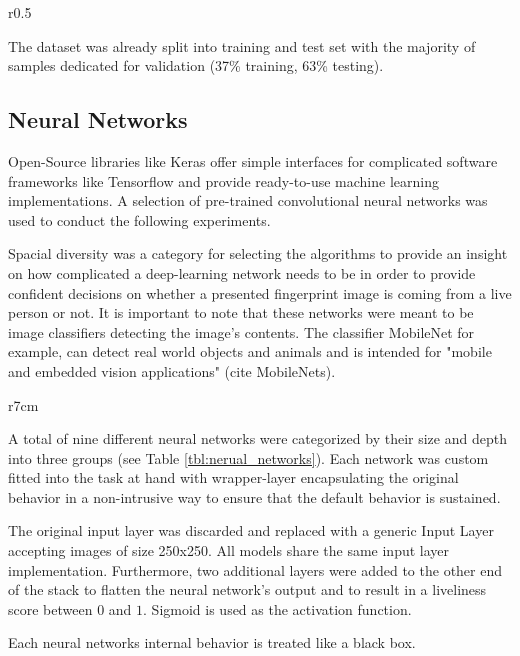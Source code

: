 \begin{wrapfigure}[5]{r}{0.5\textwidth}
    \vspace{-4mm}
    
\end{wrapfigure}%
%
\smallskip\noindent
The dataset was already split into training and test set with the majority of samples dedicated for validation (37\% training, 63\% testing).

\medskip
\subsection{Neural Networks}
Open-Source libraries like Keras offer simple interfaces for complicated software frameworks like Tensorflow and provide ready-to-use machine learning implementations.
A selection of pre-trained convolutional neural networks was used to conduct the following experiments.

\medskip\noindent
Spacial diversity was a category for selecting the algorithms to provide an insight on how complicated a deep-learning network needs to be in order to provide confident decisions on whether a presented fingerprint image is coming from a live person or not.
It is important to note that these networks were meant to be image classifiers detecting the image's contents.
The classifier MobileNet for example, can detect real world objects and animals and is intended for "mobile and embedded vision applications" (cite MobileNets).

\begin{wrapfigure}[13]{r}{7cm}
    
    \label{tbl:nerual_networks}
\end{wrapfigure}
\noindent
A total of nine different neural networks were categorized by their size and depth into three groups (see Table \ref{tbl:nerual_networks}).
Each network was custom fitted into the task at hand with wrapper-layer encapsulating the original behavior in a non-intrusive way to ensure that the default behavior is sustained.

\smallskip\noindent
The original input layer was discarded and replaced with a generic Input Layer accepting images of size 250x250. All models share the same input layer implementation.
Furthermore, two additional layers were added to the other end of the stack to flatten the neural network's output and to result in a liveliness score between $0$ and $1$.
Sigmoid is used as the activation function.

\noindent
Each neural networks internal behavior is treated like a black box.


